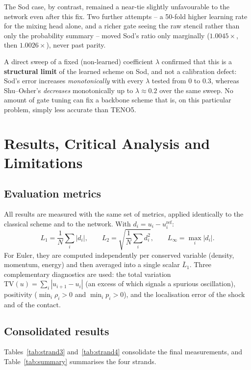 \documentclass[12pt,a4paper,oneside]{report}
\begin{document}
The Sod case, by contrast, remained a near-tie slightly unfavourable to the
network even after this fix. Two further attempts -- a 50-fold higher learning
rate for the mixing head alone, and a richer gate seeing the raw stencil rather
than only the probability summary -- moved Sod's ratio only marginally
($1.0045\times$, then $1.0026\times$), never past parity.

A direct sweep of a fixed (non-learned) coefficient $\lambda$ confirmed that
this is a \textbf{structural limit} of the learned scheme on Sod, and not a
calibration defect: Sod's error increases \emph{monotonically} with every
$\lambda$ tested from $0$ to $0.3$, whereas Shu--Osher's \emph{decreases}
monotonically up to $\lambda \approx 0.2$ over the same sweep. No amount of
gate tuning can fix a backbone scheme that is, on this particular problem,
simply less accurate than TENO5.

\chapter{Results, Critical Analysis and Limitations}
\label{chap:results}

\section{Evaluation metrics}
\label{sec:metrics}

All results are measured with the same set of metrics, applied identically to
the classical scheme and to the network. With $d_i = u_i - u_i^{\text{ref}}$:
\[
L_1 = \frac{1}{N}\sum_i |d_i|, \qquad
L_2 = \sqrt{\frac{1}{N}\sum_i d_i^2}, \qquad
L_\infty = \max_i |d_i|.
\]
For Euler, they are computed independently per conserved variable (density,
momentum, energy) and then averaged into a single scalar $\bar L_1$. Three
complementary diagnostics are used: the total variation
$\mathrm{TV}(u)=\sum_i|u_{i+1}-u_i|$ (an excess of which signals a spurious
oscillation), positivity ($\min_i \rho_i > 0$ and $\min_i p_i > 0$), and the
localisation error of the shock and of the contact.

\section{Consolidated results}
\label{sec:consolidated}

Tables~\ref{tab:strand3} and~\ref{tab:strand4} consolidate the final
measurements, and Table~\ref{tab:summary} summarises the four strands.
\end{document}
